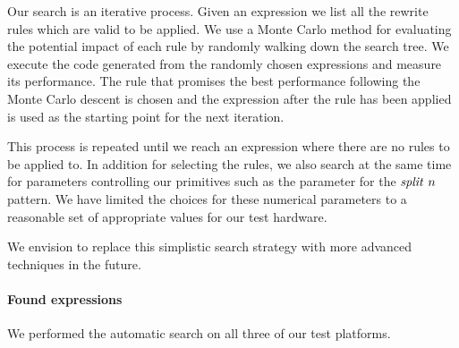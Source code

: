 Our search is an iterative process.
Given an expression we list all the rewrite rules which are valid to be applied.
We use a Monte Carlo method for evaluating the potential impact of each rule by randomly walking down the search tree.
We execute the code generated from the randomly chosen expressions and measure its performance.
The rule that promises the best performance following the Monte Carlo descent is chosen and the expression after the rule has been applied is used as the starting point for the next iteration.

This process is repeated until we reach an expression where there are no rules to be applied to.
In addition for selecting the rules, we also search at the same time for parameters controlling our primitives such as the parameter for the $\text{\textit{split}}\ n$ pattern.
We have limited the choices for these numerical parameters to a reasonable set of appropriate values for our test hardware.

We envision to replace this simplistic search strategy with more advanced techniques in the future.

\paragraph{Found expressions}
We performed the automatic search on all three of our test platforms.

